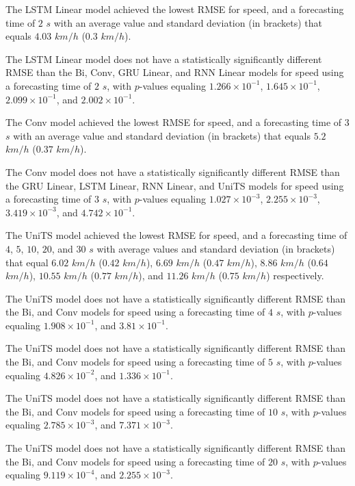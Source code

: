 \documentclass[preprint,12pt]{elsarticle}
\begin{document}
The LSTM Linear model achieved the lowest RMSE for speed, and a forecasting time of $2$ $s$ with an average value and standard deviation (in brackets) that equals $4.03$ $km/h$ ($0.3$ $km/h$).

The LSTM Linear model does not have a statistically significantly different RMSE than the Bi, Conv, GRU Linear, and RNN Linear models for speed using a forecasting time of $2$ $s$, with $p$-values equaling $1.266 \times 10^{-1}$, $1.645 \times 10^{-1}$, $2.099 \times 10^{-1}$, and $2.002 \times 10^{-1}$.

The Conv model achieved the lowest RMSE for speed, and a forecasting time of $3$ $s$ with an average value and standard deviation (in brackets) that equals $5.2$ $km/h$ ($0.37$ $km/h$).

The Conv model does not have a statistically significantly different RMSE than the GRU Linear, LSTM Linear, RNN Linear, and UniTS models for speed using a forecasting time of $3$ $s$, with $p$-values equaling $1.027 \times 10^{-3}$, $2.255 \times 10^{-3}$, $3.419 \times 10^{-3}$, and $4.742 \times 10^{-1}$.

The UniTS model achieved the lowest RMSE for speed, and a forecasting time of $4$, $5$, $10$, $20$, and $30$ $s$ with average values and standard deviation (in brackets) that equal $6.02$ $km/h$ ($0.42$ $km/h$), $6.69$ $km/h$ ($0.47$ $km/h$), $8.86$ $km/h$ ($0.64$ $km/h$), $10.55$ $km/h$ ($0.77$ $km/h$), and $11.26$ $km/h$ ($0.75$ $km/h$) respectively.

The UniTS model does not have a statistically significantly different RMSE than the Bi, and Conv models for speed using a forecasting time of $4$ $s$, with $p$-values equaling $1.908 \times 10^{-1}$, and $3.81 \times 10^{-1}$.

The UniTS model does not have a statistically significantly different RMSE than the Bi, and Conv models for speed using a forecasting time of $5$ $s$, with $p$-values equaling $4.826 \times 10^{-2}$, and $1.336 \times 10^{-1}$.

The UniTS model does not have a statistically significantly different RMSE than the Bi, and Conv models for speed using a forecasting time of $10$ $s$, with $p$-values equaling $2.785 \times 10^{-3}$, and $7.371 \times 10^{-3}$.

The UniTS model does not have a statistically significantly different RMSE than the Bi, and Conv models for speed using a forecasting time of $20$ $s$, with $p$-values equaling $9.119 \times 10^{-4}$, and $2.255 \times 10^{-3}$.
\end{document}
